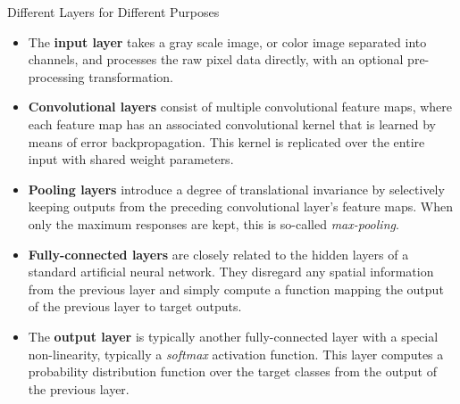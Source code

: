 \documentclass[final,hyperref={pdfpagelabels=false}]{beamer}
\begin{document}
\begin{frame}
\begin{columns}[T]
\begin{column}{.32\textwidth}
      \begin{block}{Different Layers for Different Purposes}
        \begin{itemize} 
          \item The \textbf{input layer} takes a gray scale image, or color image separated into channels, and processes 
            the raw pixel data directly, with an optional pre-processing transformation.
          \item \textbf{Convolutional layers} consist of multiple convolutional feature maps, where each feature map has an associated
            convolutional kernel that is learned by means of error backpropagation.  This kernel is replicated over the entire input
            with shared weight parameters.
          \item \textbf{Pooling layers} introduce a degree of translational invariance by selectively keeping outputs from the
            preceding convolutional layer's feature maps.  When only the maximum responses are kept, this is so-called
            \emph{max-pooling}.
          \item \textbf{Fully-connected layers} are closely related to the hidden layers of a standard artificial neural network.  They
            disregard any spatial information from the previous layer and simply compute a function mapping the output of the 
            previous layer to target outputs.
          \item The \textbf{output layer} is typically another fully-connected layer with a special non-linearity, typically a 
            \emph{softmax} activation function.  This layer computes a probability distribution function over the target classes
            from the output of the previous layer.
        \end{itemize} 
      \end{block}


\end{column}
\end{columns}
\end{frame}
\end{document}
